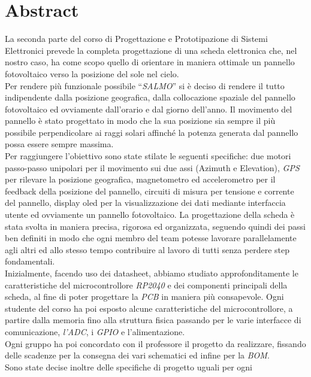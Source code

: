 \chapter{Abstract}

La seconda parte del corso di Progettazione e Prototipazione di Sistemi
Elettronici prevede la completa progettazione di una scheda elettronica
che, nel nostro caso, ha come scopo quello di orientare in maniera
ottimale un pannello fotovoltaico verso la posizione del sole nel
cielo.\\
Per rendere più funzionale possibile ``\emph{SALMO}'' si è deciso di
rendere il tutto indipendente dalla posizione geografica, dalla
collocazione spaziale del pannello fotovoltaico ed ovviamente
dall'orario e dal giorno dell'anno. Il movimento del pannello è stato
progettato in modo che la sua posizione sia sempre il più possibile
perpendicolare ai raggi solari affinché la potenza generata dal pannello
possa essere sempre massima.\\
Per raggiungere l'obiettivo sono state stilate le seguenti specifiche:
due motori passo-passo unipolari per il movimento sui due assi (Azimuth
e Elevation), \emph{GPS} per rilevare la posizione geografica,
magnetometro ed accelerometro per il feedback della posizione del
pannello, circuiti di misura per tensione e corrente del pannello,
display oled per la visualizzazione dei dati mediante interfaccia utente
ed ovviamente un pannello fotovoltaico.
La progettazione della scheda è stata svolta in maniera precisa,
rigorosa ed organizzata, seguendo quindi dei passi ben definiti in modo
che ogni membro del team potesse lavorare parallelamente agli altri ed
allo stesso tempo contribuire al lavoro di tutti senza perdere step
fondamentali.\\
Inizialmente, facendo uso dei datasheet, abbiamo studiato
approfonditamente le caratteristiche del microcontrollore \emph{RP2040}
e dei componenti principali della scheda, al fine di poter progettare la
\emph{PCB} in maniera più consapevole. Ogni studente del corso ha poi
esposto alcune caratteristiche del microcontrollore, a partire dalla
memoria fino alla struttura fisica passando per le varie interfacce di
comunicazione, \emph{l'ADC}, i \emph{GPIO} e l'alimentazione.\\
Ogni gruppo ha poi concordato con il professore il progetto da
realizzare, fissando delle scadenze per la consegna dei vari schematici
ed infine per la \emph{BOM}.\\
Sono state decise inoltre delle specifiche di progetto uguali per ogni
